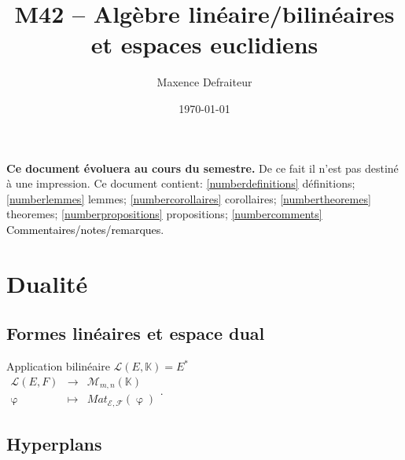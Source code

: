 \documentclass[11pt]{article} %
\title{M42 -- Algèbre linéaire/bilinéaires et espaces euclidiens}
\author{Maxence Defraiteur}
\date{\today}
\begin{document}
\maketitle
\tableofcontents


\textbf{Ce document évoluera au cours du semestre.} De ce fait il n'est pas destiné à une impression. Ce document contient:
\setcounter{topic}{-1}
 \textcolor{definition}{\ref{numberdefinitions} définitions};
\setcounter{topic}{-1}
\lemme \textcolor{lemme}{\ref{numberlemmes} lemmes};
\setcounter{topic}{-1}
\corollaire \textcolor{corollaire}{\ref{numbercorollaires} corollaires};
\setcounter{topic}{-1}
\theoreme \textcolor{theoreme}{\ref{numbertheoremes} theoremes};
\setcounter{topic}{-1}
\proposition \textcolor{proposition}{\ref{numberpropositions} propositions};
\setcounter{topic}{-1}
\commentaire \textcolor{black}{\ref{numbercomments} Commentaires/notes/remarques}.
\hypersetup{colorlinks=true, allcolors=blue}

\section{Dualité }

\subsection{Formes linéaires et espace dual}

 Application bilinéaire $ \mathcal{L}(E,\mathbb{K})=E^* $ \\
$\begin{array}{rcl}
\mathcal{L}(E,F) &\to& \mathcal{M}_{m,n}(\mathbb{K})\\
\upvarphi &\mapsto & Mat_{\mathcal{E}, \mathcal{F}}(\upvarphi)
\end{array}$.

\subsection{Hyperplans}
\end{document}
